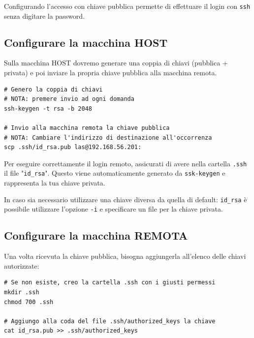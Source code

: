 \documentclass[a4paper]{report}
\newenvironment{ricordati}{\begin{tcolorbox}[fonttitle=\sffamily\bfseries\large,title=Ricordati,colframe=orange!75!white]}{\end{tcolorbox}}
\newenvironment{info}{\begin{tcolorbox}[fonttitle=\sffamily\bfseries\large,title=Info,colframe=blue!75!white]}{\end{tcolorbox}}
\newenvironment{code}{\begin{tcolorbox}[size=small]}{\end{tcolorbox}}
\begin{document}
Configurando l'accesso con chiave pubblica permette di effettuare il login con \texttt{ssh} senza digitare la password.

\subsection{Configurare la macchina HOST}
Sulla macchina HOST dovremo generare una coppia di chiavi (pubblica + privata) e poi inviare la propria chiave pubblica alla macchina remota.

\begin{code}
\begin{lstlisting}
# Genero la coppia di chiavi
# NOTA: premere invio ad ogni domanda
ssh-keygen -t rsa -b 2048

# Invio alla macchina remota la chiave pubblica
# NOTA: Cambiare l'indirizzo di destinazione all'occorrenza
scp .ssh/id_rsa.pub las@192.168.56.201:
\end{lstlisting}
\end{code}

\begin{ricordati}
	Per eseguire correttamente il login remoto, assicurati di avere nella cartella \texttt{.ssh} il file "\texttt{id\_rsa}".
	Questo viene automaticamente generato da \texttt{ssk-keygen} e rappresenta la tua chiave privata.
\end{ricordati}

\begin{info}
	In caso sia necessario utilizzare una chiave diversa da quella di default: \texttt{id\_rsa} è possibile utilizzare l'opzione \texttt{-i} e specificare un file per la chiave privata.
\end{info}

\subsection{Configurare la macchina REMOTA}
Una volta ricevuta la chiave pubblica, bisogna aggiungerla all'elenco delle chiavi autorizzate:

\begin{code}
\begin{lstlisting}
# Se non esiste, creo la cartella .ssh con i giusti permessi
mkdir .ssh
chmod 700 .ssh

# Aggiungo alla coda del file .ssh/authorized_keys la chiave
cat id_rsa.pub >> .ssh/authorized_keys
\end{lstlisting}
\end{code}
\end{document}
